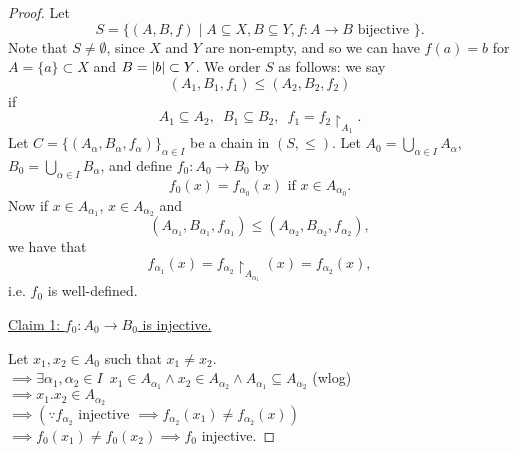 \documentclass[notoc,notitlepage]{tufte-book}
\begin{document}
\begin{proof}
  Let
  \begin{equation*}
    S = \{ (A, B, f) \mid A \subseteq X, B \subseteq Y, f : A \to B \text{ bijective } \}.
  \end{equation*}
  Note that $S \neq \emptyset$, since $X$ and $Y$ are non-empty, and so we can have $f(a) = b$ for $A = \{a\} \subset X$ and $B = \left|b\right| \subset Y$. We order $S$ as follows: we say
  \begin{equation*}
    (A_1, B_1, f_1) \leq (A_2, B_2, f_2)
  \end{equation*}
  if
  \begin{equation*}
    A_1 \subseteq A_2, \enspace B_1 \subseteq B_2, \enspace f_1 = f_2 \restriction_{A_1}.
  \end{equation*}
  Let $C = \{ (A_\alpha, B_\alpha, f_\alpha) \}_{\alpha \in I}$ be a chain in $(S, \leq)$. Let $A_0 = \bigcup_{\alpha \in I} A_\alpha$, $B_0 = \bigcup_{\alpha \in I} B_\alpha$, and define $f_0 : A_0 \to B_0$ by
  \begin{equation*}
    f_0(x) = f_{\alpha_0} (x) \text{ if } x \in A_{\alpha_0}.
  \end{equation*}
  Now if $x \in A_{\alpha_1}$, $x \in A_{\alpha_2}$ and
  \begin{equation*}
    (A_{\alpha_1}, B_{\alpha_1}, f_{\alpha_1}) \leq (A_{\alpha_2}, B_{\alpha_2}, f_{\alpha_2}),
  \end{equation*}
  we have that
  \begin{equation*}
    f_{\alpha_1}(x) = f_{\alpha_2} \restriction_{A_{\alpha_1}} (x) = f_{\alpha_2} (x),
  \end{equation*}
  i.e. $f_0$ is well-defined.

  \noindent\underline{Claim 1: $f_0 : A_0 \to B_0$ is injective.}

  Let $x_1, x_2 \in A_0$ such that $x_1 \neq x_2$. \\
  \noindent $\implies \exists \alpha_1, \alpha_2 \in I \enspace x_1 \in A_{\alpha_1} \land x_2 \in A_{\alpha_2} \land A_{\alpha_1} \subseteq A_{\alpha_2}$ (wlog) \\
  \noindent $\implies x_1. x_2 \in A_{\alpha_2}$ \\
  \noindent $\implies ( \because f_{\alpha_2} \text{ injective } \implies f_{\alpha_2}(x_1) \neq f_{\alpha_2}(x) )$ \\
  \noindent $\implies f_0(x_1) \neq f_0(x_2) \implies f_0$ injective.


\end{proof}
\end{document}
